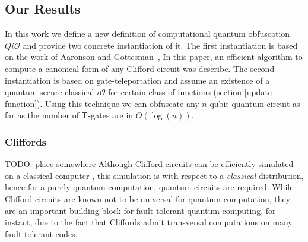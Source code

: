\subsection{Our Results}
In this work we define a new definition of computational quantum obfuscation $Qi\mathcal{O}$ and provide two concrete instantiation of it. The first instantiation is based on the work of Aaronson and Gottesman~\cite{AG04}, In this paper, an efficient algorithm to compute a canonical form of any Clifford circuit was describe. The second instantiation is based on gate-teleportation \cite{} and assume an existence of a quantum-secure classical $i\mathcal{O}$ for certain class of functions (section \ref{update function}). Using this technique we can obfuscate any $n$-qubit quantum circuit as far as the number of ${\sf T}$-gates are in $O(\log(n)).$









\subsubsection{Cliffords} TODO: place somewhere
Although Clifford circuits can be efficiently simulated on a classical computer \cite{Got98}, this simulation is with respect to a \emph{classical} distribution, hence for a purely quantum computation, quantum circuits are required. While Clifford circuits are known not to be universal for quantum computation, they are an important building block for fault-tolerant quantum computing, for instant, due to the fact that Cliffords admit transversal computations on many fault-tolerant codes\cite{BCL+06}.




